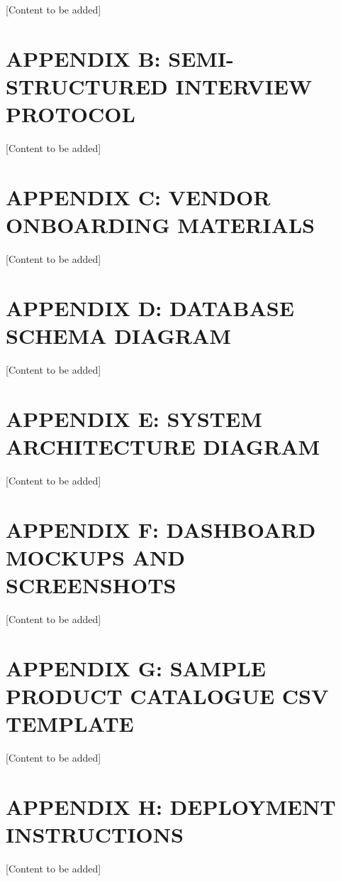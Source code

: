 \documentclass[12pt,a4paper]{article}
\begin{document}
[Content to be added]

\section{APPENDIX B: SEMI-STRUCTURED INTERVIEW PROTOCOL}

[Content to be added]

\section{APPENDIX C: VENDOR ONBOARDING MATERIALS}

[Content to be added]

\section{APPENDIX D: DATABASE SCHEMA DIAGRAM}

[Content to be added]

\section{APPENDIX E: SYSTEM ARCHITECTURE DIAGRAM}

[Content to be added]

\section{APPENDIX F: DASHBOARD MOCKUPS AND SCREENSHOTS}

[Content to be added]

\section{APPENDIX G: SAMPLE PRODUCT CATALOGUE CSV TEMPLATE}

[Content to be added]

\section{APPENDIX H: DEPLOYMENT INSTRUCTIONS}

[Content to be added]

\end{document}
